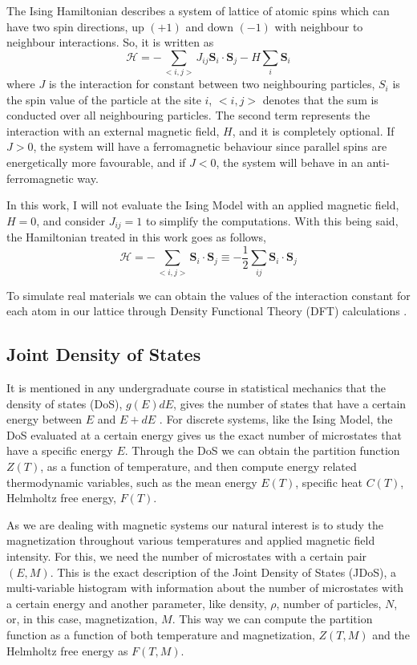 The Ising Hamiltonian describes a system of lattice of atomic spins which can have two spin directions, up $(+1)$ and down $(-1)$ with neighbour to neighbour interactions. So, it is written as
\begin{equation}
	\mathcal{H} = -\sum_{<i,j>} J_{ij} \boldsymbol{S}_i \cdot \boldsymbol{S}_j - H \sum_i\boldsymbol{S}_i
\end{equation}
where $J$ is the interaction for constant between two neighbouring particles, $S_i$ is the spin value of the particle at the site $i$, $<i,j>$ denotes that the sum is conducted over all neighbouring particles. The second term represents the interaction with an external magnetic field, $H$, and it is completely optional. If $J>0$, the system will have a ferromagnetic behaviour since parallel spins are energetically more favourable, and if $J<0$, the system will behave in an anti-ferromagnetic way.

In this work, I will not evaluate the Ising Model with an applied magnetic field, $H=0$, and consider $J_{ij}=1$ to simplify the computations. With this being said, the Hamiltonian treated in this work goes as follows,
\begin{equation}
	\mathcal{H} = -\sum_{<i,j>} \boldsymbol{S}_i \cdot \boldsymbol{S}_j 	\equiv -\frac{1}{2} \sum_{ij} \boldsymbol{S}_i \cdot \boldsymbol{S}_j
\end{equation}

To simulate real materials we can obtain the values of the interaction constant for each atom in our lattice through Density Functional Theory (DFT) calculations \cite{DFT_book, Marzari2021}.

\subsection{Joint Density of States}

It is mentioned in any undergraduate course in statistical mechanics that the density of states (DoS), $g(E)dE$, gives the number of states that have a certain energy between $E$ and $E+dE$ \cite{stat_mech}. For discrete systems, like the Ising Model, the DoS evaluated at a certain energy gives us the exact number of microstates that have a specific energy $E$. Through the DoS we can obtain the partition function $Z(T)$, as a function of temperature, and then compute energy related thermodynamic variables, such as the mean energy $E(T)$, specific heat $C(T)$, Helmholtz free energy, $F(T)$. 

As we are dealing with magnetic systems our natural interest is to study the magnetization throughout various temperatures and applied magnetic field intensity. For this, we need the number of microstates with a certain pair $(E,M)$. This is the exact description of the Joint Density of States (JDoS), a multi-variable histogram with information about the number of microstates with a certain energy and another parameter, like density, $\rho$, number of particles, $N$, or, in this case, magnetization, $M$. This way we can compute the partition function as a function of both temperature and magnetization, $Z(T,M)$ and the Helmholtz free energy as $F(T,M)$.

